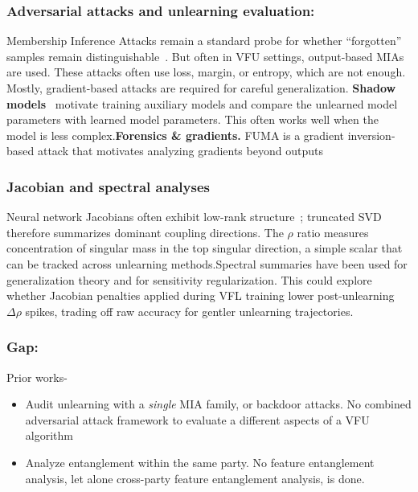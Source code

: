 \documentclass[sigconf,nonacm]{acmart}
\begin{document}
\subsubsection{Adversarial attacks and unlearning evaluation: }
Membership Inference Attacks remain a standard probe for whether ``forgotten'' samples remain distinguishable~\cite{shokri2017mia,salem2018ml_leaks}. But often in VFU settings, output-based MIAs are used. These attacks often use loss, margin, or entropy, which are not enough. Mostly, gradient-based attacks are required for careful generalization. \textbf{Shadow models}~\cite{shokri2017mia} motivate training auxiliary models and compare the unlearned model parameters with learned model parameters. This often works well when the model is less complex.\textbf{Forensics \& gradients.} FUMA is a gradient inversion-based attack that motivates analyzing gradients beyond outputs~\cite{geiping2020inverting}

\subsubsection{Jacobian and spectral analyses}
Neural network Jacobians often exhibit low-rank structure~\cite{oymak2019jacobian}; truncated SVD therefore summarizes dominant coupling directions. The $\rho$ ratio measures concentration of singular mass in the top singular direction, a simple scalar that can be tracked across unlearning methods.Spectral summaries have been used for generalization theory and for sensitivity regularization. This could explore whether Jacobian penalties applied during VFL training lower post-unlearning $\Delta\rho$ spikes, trading off raw accuracy for gentler unlearning trajectories.


\subsubsection{Gap: }Prior works-
\begin{itemize}[leftmargin=*]
    \item {Audit unlearning with a \emph{single} MIA family, or backdoor attacks. No combined adversarial attack framework to evaluate a different aspects of a VFU algorithm}
\end{itemize}
\begin{itemize}[leftmargin=*]
    \item {Analyze entanglement within the same party. No feature entanglement analysis, let alone cross-party feature entanglement analysis, is done.}
\end{itemize}
\end{document}
